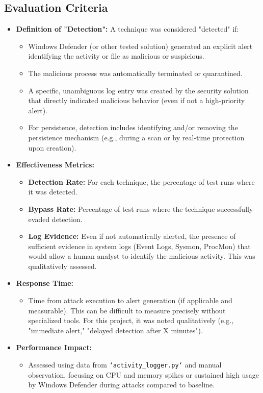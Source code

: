 \documentclass[11pt]{article}
\begin{document}
			\subsection{Evaluation Criteria}
			\begin{itemize}
				\item \textbf{Definition of "Detection":} A technique was considered "detected" if:
				\begin{itemize}
					\item Windows Defender (or other tested solution) generated an explicit alert identifying the activity or file as malicious or suspicious.
					\item The malicious process was automatically terminated or quarantined.
					\item A specific, unambiguous log entry was created by the security solution that directly indicated malicious behavior (even if not a high-priority alert).
					\item For persistence, detection includes identifying and/or removing the persistence mechanism (e.g., during a scan or by real-time protection upon creation).
				\end{itemize}
				\item \textbf{Effectiveness Metrics:}
				\begin{itemize}
					\item \textbf{Detection Rate:} For each technique, the percentage of test runs where it was detected.
					\item \textbf{Bypass Rate:} Percentage of test runs where the technique successfully evaded detection.
					\item \textbf{Log Evidence:} Even if not automatically alerted, the presence of sufficient evidence in system logs (Event Logs, Sysmon, ProcMon) that would allow a human analyst to identify the malicious activity. This was qualitatively assessed.
				\end{itemize}
				\item \textbf{Response Time:}
				\begin{itemize}
					\item Time from attack execution to alert generation (if applicable and measurable). This can be difficult to measure precisely without specialized tools. For this project, it was noted qualitatively (e.g., "immediate alert," "delayed detection after X minutes").
				\end{itemize}
				\item \textbf{Performance Impact:}
				\begin{itemize}
					\item Assessed using data from \texttt{`activity\_logger.py`} and manual observation, focusing on CPU and memory spikes or sustained high usage by Windows Defender during attacks compared to baseline.
				\end{itemize}
			\end{itemize}
\end{document}
